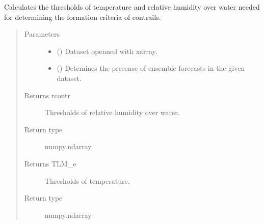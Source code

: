 \documentclass[a4paper,11pt,english]{sphinxmanual}
\begin{document}
\begin{fulllineitems}
\label{\detokenize{modules:envlib.contrail.get_cont_form_thr}}
Calculates the thresholds of temperature and relative humidity over water needed for determining the
formation criteria of contrails.
\begin{quote}\begin{description}
\item[{Parameters}] \leavevmode\begin{itemize}
\item {} 
 () \textendash{} Dataset openned with xarray.

\item {} 
 () \textendash{} Detemines the presense of ensemble forecasts in the given dataset.

\end{itemize}

\item[{Returns rcontr}] \leavevmode
Thresholds of relative humidity over water.

\item[{Return type}] \leavevmode
numpy.ndarray

\item[{Returns TLM\_e}] \leavevmode
Thresholds of temperature.

\item[{Return type}] \leavevmode
numpy.ndarray

\end{description}\end{quote}

\end{fulllineitems}

\end{document}
